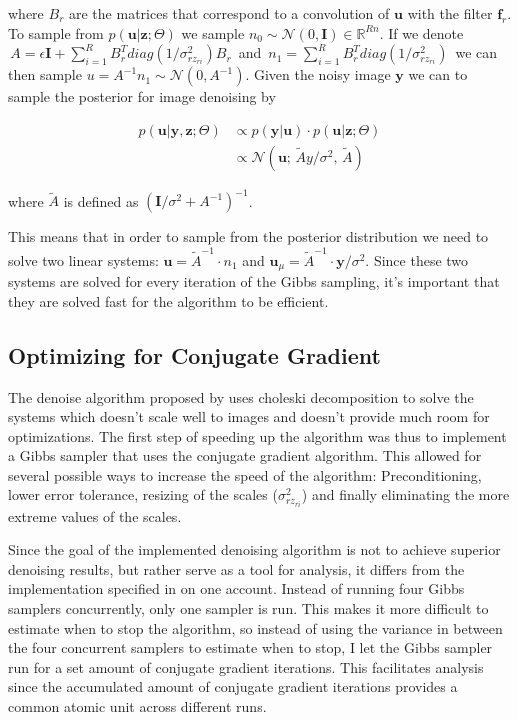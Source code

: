 \documentclass{article}
\begin{document}
where $B_r$ are the matrices that correspond to a convolution of 
$\textbf{u}$ with the filter $\textbf{f}_r$. To sample from 
$p(\textbf{u}|\textbf{z};\Theta)$ we sample $n_0 \sim \mathcal{N}(0, 
\textbf{I}) \in \mathbb{R}^{Rn}$. If we denote $\,A = \epsilon 
\textbf{I} + \sum_{i=1}^{R} B_r^T diag(1/\sigma^2_{rz_{ri}}) B_r\,$ and 
$\,n_1 = \sum_{i=1}^{R} B_r^T diag(1/\sigma^2_{rz_{ri}})\,$ we can then 
sample $u = A^{-1} n_1 \sim \mathcal{N}(0, A^{-1})$. Given the noisy 
image $\textbf{y}$ we can to sample the posterior for image denoising by

\begin{align}
	p(\textbf{u}| \textbf{y}, \textbf{z}; \Theta) & \propto 
	p(\textbf{y}|\textbf{u}) \cdot p(\textbf{u}|\textbf{z};\Theta) \\
	& \propto \mathcal{N} \left( \textbf{u} ; \, \tilde{A} y / \sigma^2, 
	\, \tilde{A}\right)
\end{align}

where $\tilde{A}$ is defined as $(\textbf{I}/\sigma^2 + A^{-1})^{-1}$.

This means that in order to sample from the posterior distribution we 
need to solve two linear systems: $\textbf{u} = \tilde{A}^{-1} \cdot 
n_1$ and $\textbf{u}_{\mu} = \tilde{A}^{-1} \cdot \textbf{y}/\sigma^2$.  
Since these two systems are solved for every iteration of the Gibbs 
sampling, it's important that they are solved fast for the algorithm to 
be efficient.  

\subsection{Optimizing for Conjugate Gradient}

The denoise algorithm proposed by \citep{uwe} uses choleski 
decomposition to solve the systems which doesn't scale well to images 
and doesn't provide much room for optimizations. The first step of 
speeding up the algorithm was thus to implement a Gibbs sampler that 
uses the conjugate gradient algorithm. This allowed for several possible 
ways to increase the speed of the algorithm: Preconditioning, lower 
error tolerance, resizing of the scales ($\sigma^2_{rz_{ri}}$) and 
finally eliminating the more extreme values of the scales.

Since the goal of the implemented denoising algorithm is not to achieve 
superior denoising results, but rather serve as a tool for analysis, it 
differs from the implementation specified in \citep{uwe} on one account.  
Instead of running four Gibbs samplers concurrently, only one sampler is 
run.  This makes it more difficult to estimate when to stop the 
algorithm, so instead of using the variance in between the four 
concurrent samplers to estimate when to stop, I let the Gibbs sampler 
run for a set amount of conjugate gradient iterations. This facilitates 
analysis since the accumulated amount of conjugate gradient iterations 
provides a common atomic unit across different runs.
\end{document}
